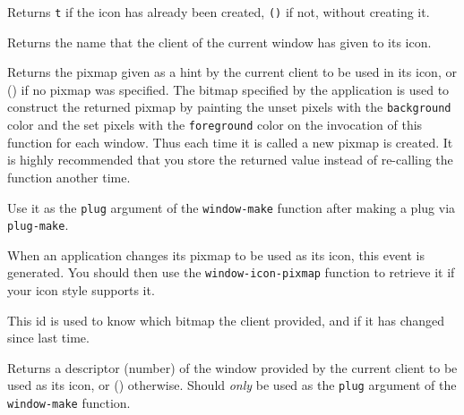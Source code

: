 Returns \verb|t| if the icon has already been created, \verb|()| if not,
without creating it.

        

Returns the name that the client of the current window has given to its icon.

        

Returns the pixmap given as a hint by the current client to be used in its
icon, or () if no pixmap was specified. The bitmap specified by the
application is used to construct the returned pixmap by painting the unset
pixels with the \verb"background" color and the set pixels with the
\verb"foreground" color on the invocation of this function for each window.
Thus each time it is called a new pixmap is created. It is highly
recommended that you store the returned value instead of re-calling the
function another time.

Use it as the \verb"plug" argument of the \verb"window-make" function after
making a plug via \verb"plug-make".

        

When an application changes its pixmap to be used as its icon, this event is
generated. You should then use the \verb"window-icon-pixmap" function to
retrieve it if your icon style supports it.

        

This id is used to know which bitmap the client provided, and if it has
changed since last time.

        

Returns a descriptor (number) of the window provided by the current client
to be used as its icon, or () otherwise. Should {\em only} be used as the
\verb"plug" argument of the \verb"window-make" function.

        
